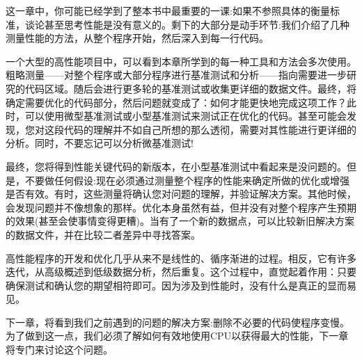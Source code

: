这一章中，你可能已经学到了整本书中最重要的一课:如果不参照具体的衡量标准，谈论甚至思考性能是没有意义的。剩下的大部分是动手环节:我们介绍了几种测量性能的方法，从整个程序开始，然后深入到每一行代码。

一个大型的高性能项目中，可以看到本章所学到的每一种工具和方法会多次使用。粗略测量——对整个程序或大部分程序进行基准测试和分析——指向需要进一步研究的代码区域。随后会进行更多轮的基准测试或收集更详细的数据文件。最终，将确定需要优化的代码部分，然后问题就变成了：如何才能更快地完成这项工作？此时，可以使用微型基准测试或小型基准测试来测试正在优化的代码。甚至可能会发现，您对这段代码的理解并不如自己所想的那么透彻，需要对其性能进行更详细的分析。同时，不要忘记可以分析微基准测试!

最终，您将得到性能关键代码的新版本，在小型基准测试中看起来是没问题的。但是，不要做任何假设:现在必须通过测量整个程序的性能来确定所做的优化或增强是否有效。有时，这些测量将确认您对问题的理解，并验证解决方案。其他时候，会发现问题并不像想象的那样。优化本身虽然有益，但并没有对整个程序产生预期的效果(甚至会使事情变得更糟)。当有了一个新的数据点，可以比较新旧解决方案的数据文件，并在比较二者差异中寻找答案。

高性能程序的开发和优化几乎从来不是线性的、循序渐进的过程。相反，它有许多迭代，从高级概述到低级数据分析，然后重复。这个过程中，直觉起着作用：只要确保测试和确认您的期望相符即可。因为涉及到性能时，没有什么是真正的显而易见。

下一章，将看到我们之前遇到的问题的解决方案:删除不必要的代码使程序变慢。为了做到这一点，我们必须了解如何有效地使用CPU以获得最大的性能，下一章将专门来讨论这个问题。